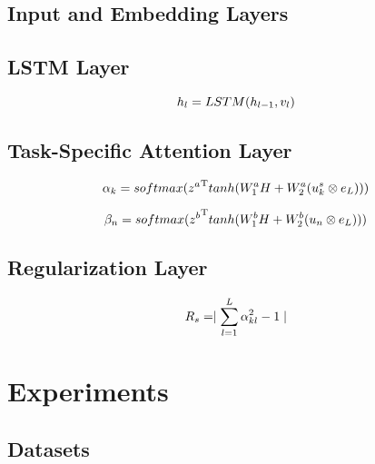 \documentclass[11pt,a4paper]{article}
\begin{document}
\subsection{Input and Embedding Layers}

\subsection{LSTM Layer}

\begin{equation} 
\setlength{\abovedisplayskip}{4pt}  %
\setlength{\belowdisplayskip}{4pt}  %
   h_l = LSTM(h_{l-1},v_l)
\end{equation}

\subsection{Task-Specific Attention Layer}

\begin{equation} 
\setlength{\abovedisplayskip}{4pt}  %
\setlength{\belowdisplayskip}{4pt}  %
    \alpha_k = softmax({z^a}^\mathrm{T}tanh(W_{1}^{a}{H} + W_{2}^{a}(u_k^{s}\otimes{e_L}))) 
  \label{equation_absa_att}
\end{equation}

\begin{equation} 
\setlength{\abovedisplayskip}{4pt}  %
\setlength{\belowdisplayskip}{4pt}  %
    \beta_n = softmax({z^b}^\mathrm{T}tanh(W_{1}^{b}{H} + W_{2}^{b}(u_n\otimes{e_L}))) 
  \label{equation_acd_att}
\end{equation}

\subsection{Regularization Layer}

\begin{equation} 
\setlength{\abovedisplayskip}{4pt}  %
\setlength{\belowdisplayskip}{4pt}  %
    R_s = \mid\sum\limits_{l=1}^L{\alpha_{kl}^{2}} - 1\mid
    \label{equation:sparse_reg}
\end{equation}

\section{Experiments}

\subsection{Datasets}
\end{document}
